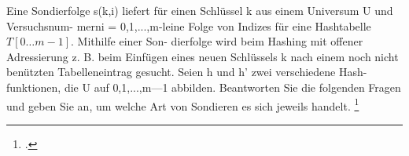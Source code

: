 \documentclass{lehramt-informatik-aufgabe}
\begin{document}

Eine Sondierfolge s(k,i) liefert für einen Schlüssel k aus einem
Universum U und Versuchsnum- merni = 0,1,...,m-leine Folge von Indizes
für eine Hashtabelle $T[0\dots m-1]$. Mithilfe einer Son- dierfolge wird beim
Hashing mit offener Adressierung z. B. beim Einfügen eines neuen
Schlüssels k nach einem noch nicht benützten Tabelleneintrag gesucht.
Seien h und h’ zwei verschiedene Hash- funktionen, die U auf
{0,1,...,m—1} abbilden. Beantworten Sie die folgenden Fragen und geben
Sie an, um welche Art von Sondieren es sich jeweils handelt.
\footcite{examen:46115:2021:03}
\end{document}
